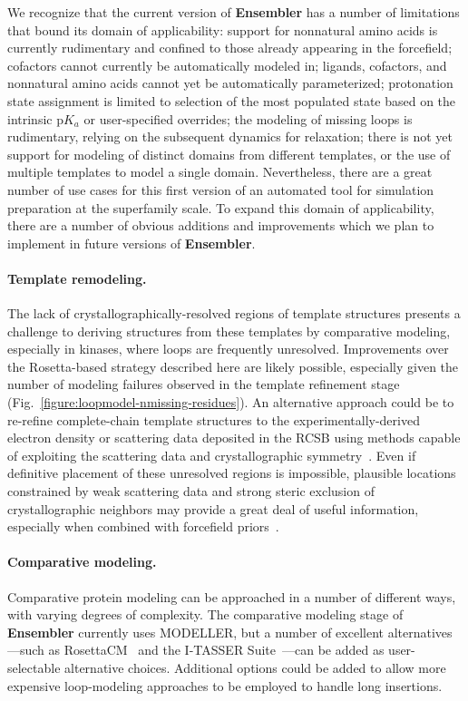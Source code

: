 \documentclass[10pt,letterpaper]{article}
\begin{document}
We recognize that the current version of {\bf Ensembler} has a number of limitations that bound its domain of applicability: support for nonnatural amino acids is currently rudimentary and confined to those already appearing in the forcefield; cofactors cannot currently be automatically modeled in; ligands, cofactors, and nonnatural amino acids cannot yet be automatically parameterized; protonation state assignment is limited to selection of the most populated state based on the intrinsic p$K_a$ or user-specified overrides; the modeling of missing loops is rudimentary, relying on the subsequent dynamics for relaxation; there is not yet support for modeling of distinct domains from different templates, or the use of multiple templates to model a single domain.
Nevertheless, there are a great number of use cases for this first version of an automated tool for simulation preparation at the superfamily scale.
To expand this domain of applicability, there are a number of obvious additions and improvements which we plan to implement in future versions of {\bf Ensembler}.

\paragraph{Template remodeling.}
The lack of crystallographically-resolved regions of template structures presents a challenge to deriving structures from these templates by comparative modeling, especially in kinases, where loops are frequently unresolved.
Improvements over the Rosetta-based strategy described here are likely possible, especially given the number of modeling failures observed in the template refinement stage (Fig.~\ref{figure:loopmodel-nmissing-residues}).
An alternative approach could be to re-refine complete-chain template structures to the experimentally-derived electron density or scattering data deposited in the RCSB using methods capable of exploiting the scattering data and crystallographic symmetry~\cite{schnieders:biophys-j:2010:x-ray-refinement}.
Even if definitive placement of these unresolved regions is impossible, plausible locations constrained by weak scattering data and strong steric exclusion of crystallographic neighbors may provide a great deal of useful information, especially when combined with forcefield priors~\cite{schnieders:jctc:2011:space-group-pme}.

\paragraph{Comparative modeling.}
Comparative protein modeling can be approached in a number of different ways, with varying degrees of complexity.
The comparative modeling stage of {\bf Ensembler} currently uses MODELLER, but a number of excellent alternatives---such as RosettaCM~\cite{baker:structure:2013:rosettacm} and the I-TASSER Suite~\cite{yang:nature-methods:2015:i-tasser-suite}---can be added as user-selectable alternative choices.
Additional options could be added to allow more expensive loop-modeling approaches to be employed to handle long insertions.
\end{document}
